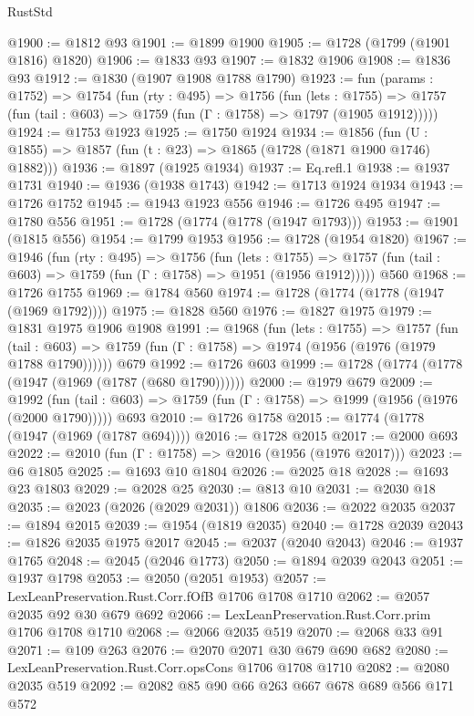 \begin{lexlean}{RustStd}
\begin{coremodule}
@1900 := @1812 @93
@1901 := @1899 @1900
@1905 := @1728 (@1799 (@1901 @1816) @1820)
@1906 := @1833 @93
@1907 := @1832 @1906
@1908 := @1836 @93
@1912 := @1830 (@1907 @1908 @1788 @1790)
@1923 := fun (params : @1752) =>
  @1754
    (fun (rty : @495) =>
    @1756
      (fun (lets : @1755) =>
      @1757 (fun (tail : @603) => @1759 (fun (Γ : @1758) => @1797 (@1905 @1912)))))
@1924 := @1753 @1923
@1925 := @1750 @1924
@1934 := @1856 (fun (U : @1855) => @1857 (fun (t : @23) => @1865 (@1728 (@1871 @1900 @1746) @1882)))
@1936 := @1897 (@1925 @1934)
@1937 := Eq.refl.{1}
@1938 := @1937 @1731
@1940 := @1936 (@1938 @1743)
@1942 := @1713 @1924 @1934
@1943 := @1726 @1752
@1945 := @1943 @1923 @556
@1946 := @1726 @495
@1947 := @1780 @556
@1951 := @1728 (@1774 (@1778 (@1947 @1793)))
@1953 := @1901 (@1815 @556)
@1954 := @1799 @1953
@1956 := @1728 (@1954 @1820)
@1967 := @1946
    (fun (rty : @495) =>
    @1756
      (fun (lets : @1755) =>
      @1757 (fun (tail : @603) => @1759 (fun (Γ : @1758) => @1951 (@1956 @1912)))))
    @560
@1968 := @1726 @1755
@1969 := @1784 @560
@1974 := @1728 (@1774 (@1778 (@1947 (@1969 @1792))))
@1975 := @1828 @560
@1976 := @1827 @1975
@1979 := @1831 @1975 @1906 @1908
@1991 := @1968
    (fun (lets : @1755) =>
    @1757
      (fun (tail : @603) => @1759 (fun (Γ : @1758) => @1974 (@1956 (@1976 (@1979 @1788 @1790))))))
    @679
@1992 := @1726 @603
@1999 := @1728 (@1774 (@1778 (@1947 (@1969 (@1787 (@680 @1790))))))
@2000 := @1979 @679
@2009 := @1992
    (fun (tail : @603) => @1759 (fun (Γ : @1758) => @1999 (@1956 (@1976 (@2000 @1790)))))
    @693
@2010 := @1726 @1758
@2015 := @1774 (@1778 (@1947 (@1969 (@1787 @694))))
@2016 := @1728 @2015
@2017 := @2000 @693
@2022 := @2010 (fun (Γ : @1758) => @2016 (@1956 (@1976 @2017)))
@2023 := @6 @1805
@2025 := @1693 @10 @1804
@2026 := @2025 @18
@2028 := @1693 @23 @1803
@2029 := @2028 @25
@2030 := @813 @10
@2031 := @2030 @18
@2035 := @2023 (@2026 (@2029 @2031)) @1806
@2036 := @2022 @2035
@2037 := @1894 @2015
@2039 := @1954 (@1819 @2035)
@2040 := @1728 @2039
@2043 := @1826 @2035 @1975 @2017
@2045 := @2037 (@2040 @2043)
@2046 := @1937 @1765
@2048 := @2045 (@2046 @1773)
@2050 := @1894 @2039 @2043
@2051 := @1937 @1798
@2053 := @2050 (@2051 @1953)
@2057 := LexLeanPreservation.Rust.Corr.fOfB @1706 @1708 @1710
@2062 := @2057 @2035 @92 @30 @679 @692
@2066 := LexLeanPreservation.Rust.Corr.prim @1706 @1708 @1710
@2068 := @2066 @2035 @519
@2070 := @2068 @33 @91
@2071 := @109 @263
@2076 := @2070 @2071 @30 @679 @690 @682
@2080 := LexLeanPreservation.Rust.Corr.opsCons @1706 @1708 @1710
@2082 := @2080 @2035 @519
@2092 := @2082 @85 @90 @66 @263 @667 @678 @689 @566 @171 @572

\end{coremodule}
\end{lexlean}
